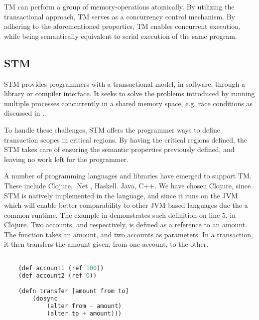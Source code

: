 \ac{TM} can perform a group of memory-operations atomically\cite[48]{harris2005composable}. By utilizing the transactional approach, \ac{TM} serves as a concurrency control mechanism. By adhering to the aforementioned properties, \ac{TM} enables concurrent execution, while being semantically equivalent to serial execution of the same program.

\subsection{\acl{STM}}
\ac{STM} provides programmers with a transactional model, in software, through a library or compiler interface\cite{herlihy2011tm}. It seeks to solve the problems introduced by running multiple processes concurrently in a shared memory space, e.g. race conditions as discussed in . 

To handle these challenges, \ac{STM} offers the programmer ways to define transaction scopes in critical regions. By having the critical regions defined, the \ac{STM} takes care of ensuring the semantic properties previously defined, and leaving no work left for the programmer.

A number of programming languages and libraries have emerged to support TM. These include Clojure, .Net , Haskell. Java, C++. We have chosen Clojure, since \ac{STM} is natively implemented in the language, and since it runs on the \ac{JVM} which will enable better comparability to other \ac{JVM} based languages due the a common runtime. The example in  demonstrates such definition on line 5, in Clojure. Two accounts,  and  respectively, is defined as a reference to an amount. The function  takes an amount, and two accounts as parameters. In a transaction, it then transfers the amount given, from one account, to the other.

\begin{lstlisting}[label=lst:stmexample,
  caption={STM in Clojure},
  language=Lisp,  
  showspaces=false,
  showtabs=false,
  breaklines=true,
  showstringspaces=false,
  breakatwhitespace=true,
  commentstyle=\color{greencomments},
  keywordstyle=\color{bluekeywords},
  stringstyle=\color{redstrings}]  % Start your code-block

	(def account1 (ref 100))
	(def account2 (ref 0))

	(defn transfer [amount from to]
    	(dosync
    		(alter from - amount)
    		(alter to + amount)))
       
\end{lstlisting}

